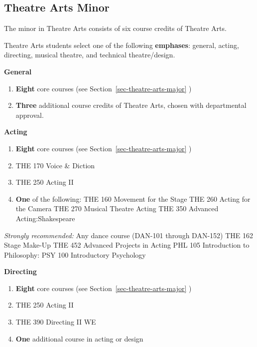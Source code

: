 \documentclass[
  letterpaper,
]{scrbook}
\begin{document}
\hypertarget{theatre-arts-minor}{%
\subsection{Theatre Arts Minor}\label{theatre-arts-minor}}

The minor in Theatre Arts consists of six course credits of Theatre
Arts.

Theatre Arts students select one of the following \textbf{emphases}:
general, acting, directing, musical theatre, and technical
theatre/design.

\textbf{General}

\begin{enumerate}
\def\labelenumi{\arabic{enumi}.}
\item
  \textbf{Eight} core courses (see Section~\ref{sec-theatre-arts-major}
  )
\item
  \textbf{Three} additional course credits of Theatre Arts, chosen with
  departmental approval.
\end{enumerate}

\textbf{Acting}

\begin{enumerate}
\def\labelenumi{\arabic{enumi}.}
\item
  \textbf{Eight} core courses (see Section~\ref{sec-theatre-arts-major}
  )
\item
  THE 170 Voice \& Diction
\item
  THE 250 Acting II
\item
  \textbf{One} of the following: THE 160 Movement for the Stage THE 260
  Acting for the Camera THE 270 Musical Theatre Acting THE 350 Advanced
  Acting:Shakespeare
\end{enumerate}

\emph{Strongly recommended:} Any dance course (DAN-101 through DAN-152)
THE 162 Stage Make-Up THE 452 Advanced Projects in Acting PHL 105
Introduction to Philosophy: PSY 100 Introductory Psychology

\textbf{Directing}

\begin{enumerate}
\def\labelenumi{\arabic{enumi}.}
\item
  \textbf{Eight} core courses (see Section~\ref{sec-theatre-arts-major}
  )
\item
  THE 250 Acting II
\item
  THE 390 Directing II WE
\item
  \textbf{One} additional course in acting or design
\end{enumerate}
\end{document}
